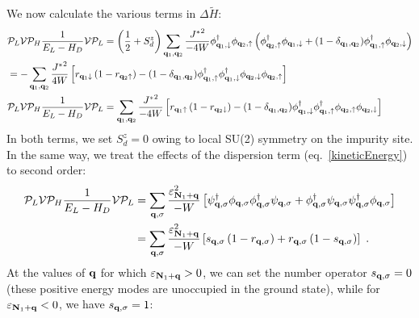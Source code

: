 We now calculate the various terms in \(\Delta \tilde H\):
\begin{equation}\begin{aligned}\label{kondoPert}
	&\mathcal{P}_L \mathcal{V} \mathcal{P}_H\frac{1}{E_L - H_D} \mathcal{V} \mathcal{P}_L = \left(\frac{1}{2} + S_d^z\right) \sum_{{\bf q}_1,{\bf q}_2}\frac{{J^*}^2}{-4W}\phi^\dagger_{{\bf q}_1,\downarrow}\phi_{{\bf q}_2, \uparrow} \left(\phi^\dagger_{{\bf q}_2,\uparrow}\phi_{{\bf q}_1, \downarrow} + (1 - \delta_{{\bf q}_1,{\bf q}_2})\phi^\dagger_{{\bf q}_1,\uparrow}\phi_{{\bf q}_2, \downarrow}\right)\\
	&= -\sum_{{\bf q}_1,{\bf q}_2}\frac{{J^*}^2}{4W}\left[r_{{\bf q}_1 \downarrow} \left(1 - r_{{\bf q}_2 \uparrow}\right) - (1 - \delta_{{\bf q}_1,{\bf q}_2})\phi^\dagger_{{\bf q}_1,\uparrow}\phi^\dagger_{{\bf q}_1,\downarrow}\phi_{{\bf q}_2, \downarrow}\phi_{{\bf q}_2, \uparrow}\right]\\
	&\mathcal{P}_L \mathcal{V} \mathcal{P}_H\frac{1}{E_L - H_D} \mathcal{V} \mathcal{P}_L = \sum_{{\bf q}_1,{\bf q}_2}\frac{{J^*}^2}{-4W}\left[r_{{\bf q}_1 \uparrow} \left(1 - r_{{\bf q}_2 \downarrow}\right) - (1 - \delta_{{\bf q}_1,{\bf q}_2})\phi^\dagger_{{\bf q}_1,\downarrow}\phi^\dagger_{{\bf q}_1,\uparrow}\phi_{{\bf q}_2, \uparrow}\phi_{{\bf q}_2, \downarrow}\right] \\
\end{aligned}\end{equation}
In both terms, we set \(S_d^z = 0\) owing to local SU(2) symmetry on the impurity site. In the same way, we treat the effects of the dispersion term (eq.~\ref{kineticEnergy}) to second order:
\begin{equation}\begin{aligned}
	\mathcal{P}_L \mathcal{V} \mathcal{P}_H\frac{1}{E_L - H_D} \mathcal{V} \mathcal{P}_L &= \sum_{{\bf q}, \sigma}\frac{\varepsilon_{{\bf N}_1 + {\bf q}}^2}{-W}\left[ {\psi}^\dagger_{{\bf q},\sigma} {\phi}_{{\bf q},\sigma}{\phi}^\dagger_{{\bf q},\sigma} \psi_{{\bf q},\sigma} + {\phi}^\dagger_{{\bf q},\sigma} \psi_{{\bf q},\sigma}{\psi}^\dagger_{{\bf q},\sigma} {\phi}_{{\bf q},\sigma}\right] \\
																						 &= \sum_{{\bf q}, \sigma}\frac{\varepsilon_{{\bf N}_1 + {\bf q}}^2}{-W}\left[ s_{{\bf q},\sigma} \left(1 - r_{{\bf q},\sigma}\right) + r_{{\bf q},\sigma} \left(1 - s_{{\bf q},\sigma}\right)\right]~.
\end{aligned}\end{equation}
At the values of \({\bf q}\) for which \(\varepsilon_{{\bf N}_1 + {\bf q}} > 0\), we can set the number operator \(s_{{\bf q},\sigma} = 0\) (these positive energy modes are unoccupied in the ground state), while for \(\varepsilon_{{\bf N}_1 + {\bf q}} < 0\), we have \(s_{{\bf q},\sigma} = 1\):
